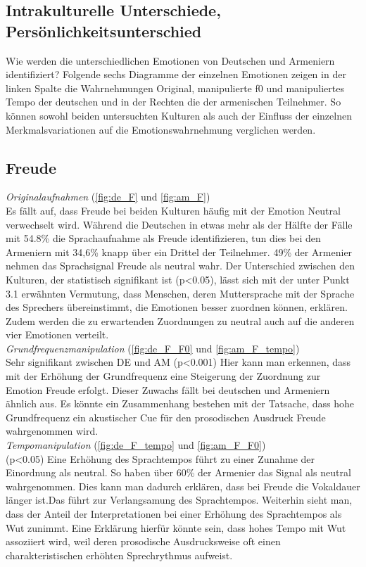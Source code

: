 \documentclass[11pt,a4paper,headsepline,twoside,toc=bibliography]{scrreprt}
\begin{document}
\subsection{Intrakulturelle Unterschiede, Persönlichkeitsunterschied}

Wie werden die unterschiedlichen Emotionen von Deutschen und Armeniern identifiziert?
Folgende sechs Diagramme der einzelnen Emotionen zeigen in der linken Spalte die Wahrnehmungen Original, manipulierte f0 und manipuliertes Tempo der deutschen und in der Rechten die der armenischen Teilnehmer. So können sowohl beiden untersuchten Kulturen als auch der Einfluss der einzelnen Merkmalsvariationen auf die Emotionswahrnehmung verglichen werden.

\subsection{Freude}
\label{sec:Freude}

\emph{Originalaufnahmen} (\autoref{fig:de_F} und \ref{fig:am_F}) \\ 

Es fällt auf, dass Freude bei beiden Kulturen häufig mit der Emotion Neutral verwechselt wird. Während die Deutschen in etwas mehr als der Hälfte der Fälle mit 54.8\% die Sprachaufnahme als Freude identifizieren, tun dies bei den Armeniern mit 34,6\% knapp über ein Drittel der Teilnehmer. 49\% der Armenier nehmen das Sprachsignal Freude als neutral wahr.
Der Unterschied zwischen den Kulturen, der statistisch signifikant ist (p<0.05), lässt sich mit der unter Punkt 3.1 erwähnten Vermutung, dass Menschen, deren Muttersprache mit der Sprache des Sprechers übereinstimmt, die Emotionen besser zuordnen können, erklären.
Zudem werden die zu erwartenden Zuordnungen zu neutral auch auf die anderen vier Emotionen verteilt.\\

\noindent
\emph{Grundfrequenzmanipulation} (\autoref{fig:de_F_F0} und \ref{fig:am_F_tempo}) \\
Sehr signifikant zwischen DE und AM (p<0.001)
Hier kann man erkennen, dass mit der Erhöhung der Grundfrequenz eine Steigerung der Zuordnung zur Emotion Freude erfolgt. Dieser Zuwachs fällt bei deutschen und Armeniern ähnlich aus.
Es könnte ein Zusammenhang bestehen mit der Tatsache, dass hohe Grundfrequenz ein akustischer Cue für den prosodischen Ausdruck Freude wahrgenommen wird. \\

\noindent
\emph{Tempomanipulation} (\autoref{fig:de_F_tempo} und \ref{fig:am_F_F0}) \\
(p<0.05)
Eine Erhöhung des Sprachtempos führt zu einer Zunahme der Einordnung als neutral. So haben über 60\% der Armenier das Signal als neutral wahrgenommen.
Dies kann man dadurch erklären, dass bei Freude die Vokaldauer länger ist.Das führt zur Verlangsamung des Sprachtempos.
Weiterhin sieht man, dass der Anteil der Interpretationen bei einer Erhöhung des Sprachtempos als Wut zunimmt.
Eine Erklärung hierfür könnte sein, dass hohes Tempo mit Wut assoziiert wird, weil deren prosodische Ausdrucksweise oft einen charakteristischen erhöhten  Sprechrythmus aufweist. 
\end{document}
